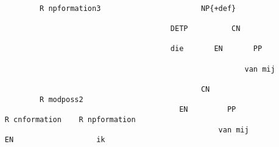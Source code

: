 \begin{verbatim}

             R npformation3                       NP{+def}
                                                 
                                           DETP          CN

                                           die       EN       PP

                                                            van mij  
                                           
                                                  CN
             R modposs2
                                             EN         PP
     R cnformation    R npformation
                                                      van mij
     EN                   ik

\end{verbatim}


